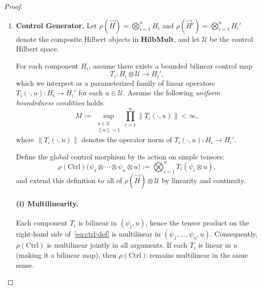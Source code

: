 \documentclass[11pt]{article}
\begin{document}
\begin{proof}
\begin{enumerate}[label=(\alph*)]
\paragraph{Boundedness.}
The uniform contraction condition $\|A_p\| \le \kappa < 1$ ensures the Neumann series converges uniformly. The induced operator norm satisfies
\[
\|\rho(\mathcal{F}_{i,j})(T)\| \le \frac{\|b\|}{1 - \kappa} < \infty,
\]
where $\|b\| = \sup_p \|b_p\|$. In the linear case, this corresponds to the standard small-gain condition ensuring the feedback loop defines a bounded map.

Therefore, under the contractive well-posedness assumption, $\rho(\mathcal{F}_{i,j})$ maps bounded multilinear operators to bounded multilinear operators, preserving both the analytic and algebraic structure required by $\mathbf{S}$.

\item \textbf{Control Generator.}
Let $\rho(\vec{H}) = \bigotimes_{i=1}^n H_i$ and $\rho(\vec{H}') = \bigotimes_{i=1}^n H_i'$ denote the composite Hilbert objects in $\mathbf{HilbMult}$, and let $\mathcal{U}$ be the control Hilbert space.

For each component $H_i$, assume there exists a bounded bilinear control map
\[
T_i: H_i \otimes \mathcal{U} \longrightarrow H_i',
\]
which we interpret as a parameterized family of linear operators $T_i(\cdot, u): H_i \to H_i'$ for each $u \in \mathcal{U}$.  
Assume the following \emph{uniform boundedness condition} holds:
\[
M := \sup_{\substack{u \in \mathcal{U} \\ \|u\| = 1}} \prod_{i=1}^n \|T_i(\cdot, u)\| < \infty,
\]
where $\|T_i(\cdot, u)\|$ denotes the operator norm of $T_i(\cdot, u): H_i \to H_i'$.

Define the global control morphism by its action on simple tensors:
\begin{equation}\label{eq:ctrl-def}
\rho(\mathrm{Ctrl})\big(\psi_1 \otimes \cdots \otimes \psi_n \otimes u\big)
:= \bigotimes_{i=1}^n T_i(\psi_i \otimes u),
\end{equation}
and extend this definition to all of $\rho(\vec{H}) \otimes \mathcal{U}$ by linearity and continuity.

\paragraph{(i) Multilinearity.}
Each component $T_i$ is bilinear in $(\psi_i, u)$, hence the tensor product on the right-hand side of~\eqref{eq:ctrl-def} is multilinear in $(\psi_1, \dots, \psi_n, u)$.  
Consequently, $\rho(\mathrm{Ctrl})$ is multilinear jointly in all arguments.  
If each $T_i$ is linear in $u$ (making it a bilinear map), then $\rho(\mathrm{Ctrl})$ remains multilinear in the same sense.


\end{enumerate}
\end{proof}
\end{document}
